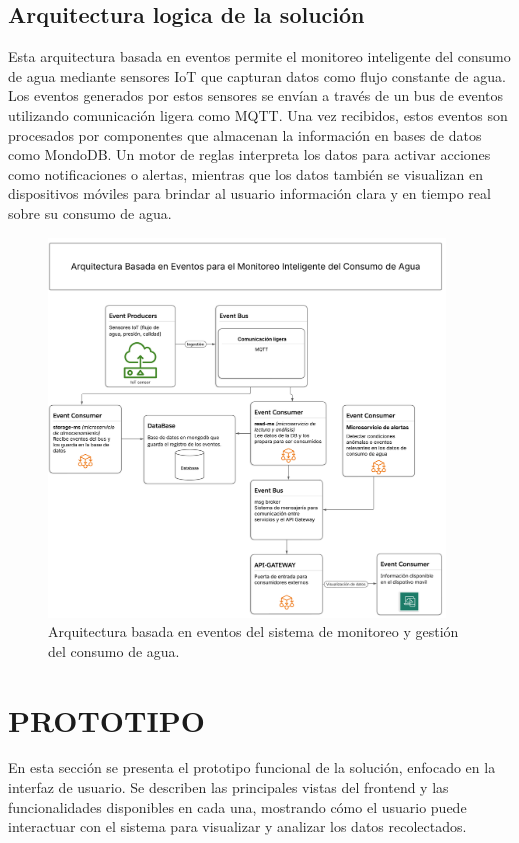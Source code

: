 \documentclass[conference]{IEEEtran}
\begin{document}
\newpage

\subsection*{\textbf{Arquitectura logica de la solución}}
Esta arquitectura basada en eventos permite el monitoreo inteligente del consumo de agua mediante sensores IoT que capturan datos como flujo constante de agua. Los eventos generados por estos sensores se envían a través de un bus de eventos utilizando comunicación ligera como MQTT. Una vez recibidos, estos eventos son procesados por componentes que almacenan la información en bases de datos como MondoDB. Un motor de reglas interpreta los datos para activar acciones como notificaciones o alertas, mientras que los datos también se visualizan en dispositivos móviles para brindar al usuario información clara y en tiempo real sobre su consumo de agua.
\begin{figure}[!htbp]
\centerline{\includegraphics[width=\linewidth,height=380px]{arquitectura_logica_final.png}}
\caption{Arquitectura basada en eventos del sistema de monitoreo y gestión del consumo de agua.}
\label{fig}
\end{figure}






\clearpage

\section{PROTOTIPO}
En esta sección se presenta el prototipo funcional de la solución, enfocado en la interfaz de usuario. Se describen las principales vistas del frontend y las funcionalidades disponibles en cada una, mostrando cómo el usuario puede interactuar con el sistema para visualizar y analizar los datos recolectados.
\end{document}
